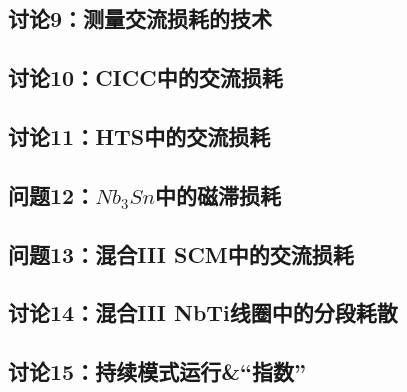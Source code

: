 \newpage
\subsection{讨论9：测量交流损耗的技术}

\newpage
\subsection{讨论10：CICC中的交流损耗}

\newpage
\subsection{讨论11：HTS中的交流损耗}

\newpage
\subsection{问题12：$Nb_3Sn$中的磁滞损耗}

\newpage
\subsection{问题13：混合III SCM中的交流损耗}

\newpage
\subsection{讨论14：混合III NbTi线圈中的分段耗散}

\newpage
\subsection{讨论15：持续模式运行\&“指数”}

